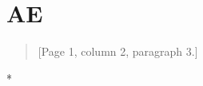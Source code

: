 {}
\section*{AE}\hfill

\begin{aecomment}
\lipsum[2][1-3]
\end{aecomment}

\begin{response}
\lipsum[4]
\end{response}

\begin{quote}[Page 1, column 2, paragraph 3.]
\lipsum[5][1] \add{\lipsum[5][2]} \lipsum[5][3] \del{\lipsum[5][4]} \lipsum[5][5]
\end{quote}

\begin{response}*
\lipsum[9][1-2]
\end{response}

\begin{aecomment}
\lipsum[2][3-4]
\end{aecomment}